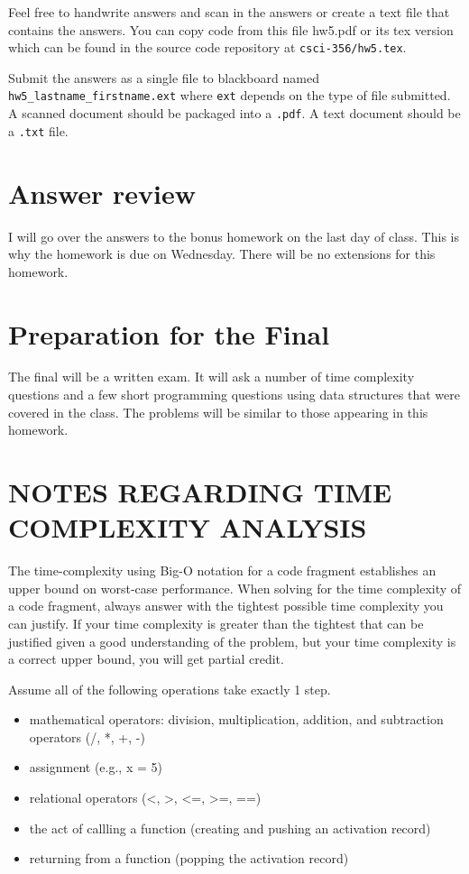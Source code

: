 \documentclass{article}
\begin{document}
Feel free to handwrite answers and scan in the answers or create
a text file that contains the answers.   You can copy code from
this file hw5.pdf or its tex version which can be found in
the source code repository at \verb|csci-356/hw5.tex|.

Submit the answers as a single file to blackboard named
\verb|hw5_lastname_firstname.ext| where \verb|ext| depends on the type
of file submitted.  A scanned document should be packaged into a \verb|.pdf|.
A text document should be a \verb|.txt| file.

\section{Answer review}

I will go over the answers to the bonus homework on the last day
of class.  This is why the homework is due on Wednesday.  There
will be no extensions for this homework.

\section{Preparation for the Final}

The final will be a written exam.  It will ask a number of time complexity
questions and a few short programming questions using data structures
that were covered in the class.  The problems will be similar to those
appearing in this homework.


\section{NOTES REGARDING TIME COMPLEXITY ANALYSIS}

The time-complexity using Big-O notation for a code fragment
establishes an upper bound on worst-case performance.  When solving
for the time complexity of a code fragment, always answer with the
tightest possible time complexity you can justify.  If your time
complexity is greater than the tightest that can be justified given a
good understanding of the problem, but your time complexity is a
correct upper bound, you will get partial credit.

Assume all of the following operations take exactly 1 step.

\begin{itemize}
\item mathematical operators: division, multiplication, addition, and
  subtraction operators (/, *, +, -)
\item assignment (e.g., x = 5)
\item relational operators (<, >, <=, >=, ==)
\item the act of callling a function (creating and pushing an activation record)
\item returning from a function (popping the activation record)
\end{itemize}
\end{document}
